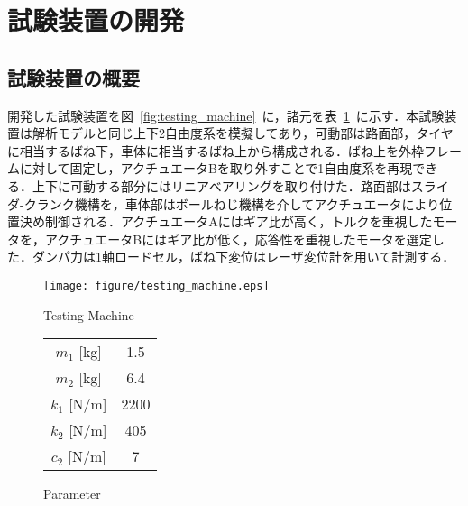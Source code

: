 \documentclass{article_vdlab_sotsuron_youshi}
\begin{document}
\section{試験装置の開発}
\vspace*{-1mm}
\subsection{試験装置の概要}
開発した試験装置を図~\ref{fig:testing_machine}~に，諸元を表~\ref{tab:parameter}~に示す．本試験装置は解析モデルと同じ上下2自由度系を模擬してあり，可動部は路面部，タイヤに相当するばね下，車体に相当するばね上から構成される．ばね上を外枠フレームに対して固定し，アクチュエータBを取り外すことで1自由度系を再現できる．上下に可動する部分にはリニアベアリングを取り付けた．路面部はスライダ-クランク機構を，車体部はボールねじ機構を介してアクチュエータにより位置決め制御される．アクチュエータAにはギア比が高く，トルクを重視したモータを，アクチュエータBにはギア比が低く，応答性を重視したモータを選定した．ダンパ力は1軸ロードセル，ばね下変位はレーザ変位計を用いて計測する．

\begin{figure}[H]
  \begin{minipage}{0.6\hsize}
    \begin{center}
      \texttt{[image: figure/testing\_machine.eps]}
      \vspace*{-1mm}
      \caption{Testing Machine}
    \label{fig:testing_machine}
    \end{center}
  \end{minipage}
  \begin{minipage}{0.35\hsize}
      \begin{center}
	\makeatletter
	\def\@captype{table}   
	\makeatother
	\caption{Parameter}
	\label{tab:parameter}
	  \begin{tabular}{cc}\hline
	    $m_1$ [kg] & 1.5\\
	    $m_2$ [kg] & 6.4\\
	    $k_1$ [N/m] & 2200\\
	    $k_2$ [N/m] & 405\\
	    $c_2$ [N/m] & 7\\\hline 
	  \end{tabular}  
      \end{center}
  \end{minipage}
\end{figure}

\vspace*{-1mm}
\end{document}
